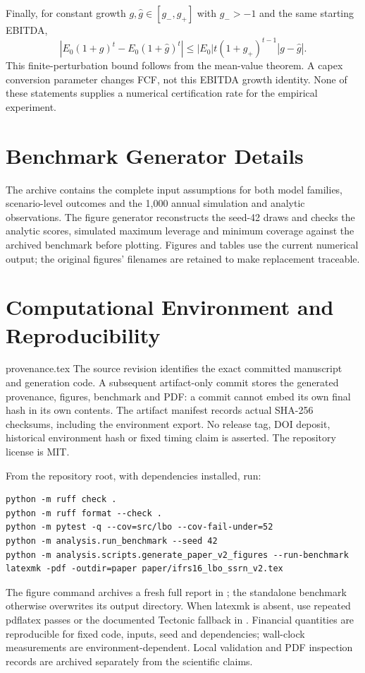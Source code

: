 \documentclass[11pt,a4paper]{article}
\makeatletter
\theoremstyle{plain}
\theoremstyle{definition}
\newcommand{\paperinput}[1]{\@@input\generatedpath#1 }
\makeatother
\begin{document}
Finally, for constant growth $g,\widehat g\in[g_-,g_+]$ with $g_->-1$ and the
same starting EBITDA,
\begin{equation}
|E_0(1+g)^t-E_0(1+\widehat g)^t|
\le |E_0|t(1+g_+)^{t-1}|g-\widehat g|.
\end{equation}
This finite-perturbation bound follows from the mean-value theorem. A capex
conversion parameter changes FCF, not this EBITDA growth identity. None of these
statements supplies a numerical certification rate for the empirical experiment.

\section{Benchmark Generator Details}\label{app:benchmark}
The archive contains the complete input assumptions for both model families,
scenario-level outcomes and the 1,000 annual simulation and analytic observations.
The figure generator reconstructs the seed-42 draws and checks the analytic
scores, simulated maximum leverage and minimum coverage against the archived
benchmark before plotting. Figures and tables use the current numerical output;
the original figures' filenames are retained to make replacement traceable.

\newpage
\section{Computational Environment and Reproducibility}\label{app:computation}
\begingroup\small\raggedright
\paperinput{provenance.tex}
\endgroup
The source revision identifies the exact committed manuscript and generation
code. A subsequent artifact-only commit stores the generated provenance, figures,
benchmark and PDF: a commit cannot embed its own final hash in its own contents.
The artifact manifest records actual SHA-256 checksums, including the environment
export. No release tag, DOI deposit, historical environment hash or fixed timing
claim is asserted. The repository license is MIT.

From the repository root, with dependencies installed, run:
\begin{verbatim}
python -m ruff check .
python -m ruff format --check .
python -m pytest -q --cov=src/lbo --cov-fail-under=52
python -m analysis.run_benchmark --seed 42
python -m analysis.scripts.generate_paper_v2_figures --run-benchmark
latexmk -pdf -outdir=paper paper/ifrs16_lbo_ssrn_v2.tex
\end{verbatim}
The figure command archives a fresh full report in
; the standalone benchmark otherwise
overwrites its output directory. When latexmk is absent, use repeated pdflatex
passes or the documented Tectonic fallback in .
Financial quantities are reproducible for fixed code, inputs, seed and dependencies;
wall-clock measurements are environment-dependent. Local validation and PDF
inspection records are archived separately from the scientific claims.
\end{document}
